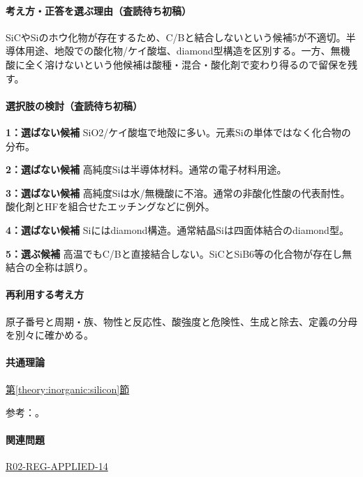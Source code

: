\paragraph{考え方・正答を選ぶ理由（査読待ち初稿）} SiCやSiのホウ化物が存在するため、C/Bと結合しないという候補5が不適切。半導体用途、地殻での酸化物/ケイ酸塩、diamond型構造を区別する。一方、無機酸に全く溶けないという他候補は酸種・混合・酸化剤で変わり得るので留保を残す。

\paragraph{選択肢の検討（査読待ち初稿）}\mbox{}\par

\noindent\textbf{1：選ばない候補} SiO2/ケイ酸塩で地殻に多い。元素Siの単体ではなく化合物の分布。\par

\noindent\textbf{2：選ばない候補} 高純度Siは半導体材料。通常の電子材料用途。\par

\noindent\textbf{3：選ばない候補} 高純度Siは水/無機酸に不溶。通常の非酸化性酸の代表耐性。酸化剤とHFを組合せたエッチングなどに例外。\par

\noindent\textbf{4：選ばない候補} Siにはdiamond構造。通常結晶Siは四面体結合のdiamond型。\par

\noindent\textbf{5：選ぶ候補} 高温でもC/Bと直接結合しない。SiCとSiB6等の化合物が存在し無結合の全称は誤り。\par

\paragraph{再利用する考え方} 原子番号と周期・族、物性と反応性、酸強度と危険性、生成と除去、定義の分母を別々に確かめる。

\paragraph{共通理論} \hyperref[theory:inorganic:silicon]{第\ref*{theory:inorganic:silicon}節}

\par 参考：\cite{inorganic_metalloid_ref,inorganic_sic,inorganic_sib6,inorganic_hf_etch}。

\paragraph{関連問題} \hyperref[q:r02-reg-applied-14]{R02-REG-APPLIED-14}

